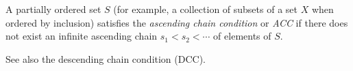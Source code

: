 \documentclass{article}
\begin{document}
A partially ordered set $S$ (for example, a collection of subsets of a set $X$ when ordered by inclusion) satisfies the {\it ascending chain condition} or {\it ACC} if there does not exist an infinite ascending chain $s_1 < s_2 < \cdots$ of elements of $S$.

See also the descending chain condition (DCC).
\end{document}
